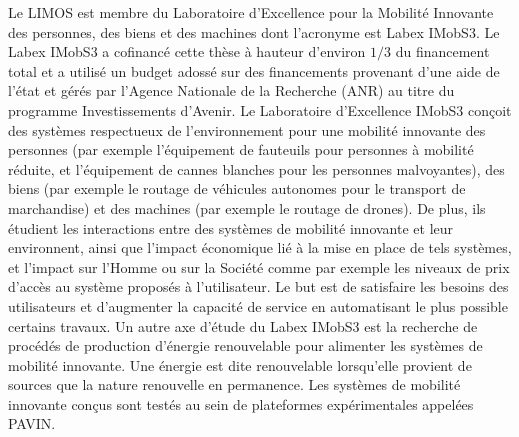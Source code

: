 Le LIMOS est membre du Laboratoire d'Excellence pour la Mobilité Innovante des personnes, des biens et des machines dont l'acronyme est Labex IMobS3.
Le Labex IMobS3 a cofinancé cette thèse à hauteur d'environ $1/3$ du financement total et a utilisé un budget adossé sur des financements provenant d'une aide de l'état et gérés par l'Agence Nationale de la Recherche (ANR) au titre du programme Investissements d'Avenir. Le Laboratoire d'Excellence IMobS3 conçoit des systèmes respectueux de l'environnement pour une mobilité innovante des personnes (par exemple l'équipement de fauteuils pour personnes à mobilité réduite, et l'équipement de cannes blanches pour les personnes malvoyantes), des biens (par exemple le routage de véhicules autonomes pour le transport de marchandise) et des machines (par exemple le routage de drones). De plus, ils étudient les interactions entre des systèmes de mobilité innovante et leur environnent, ainsi que l'impact économique lié à la mise en place de tels systèmes, et l'impact sur l'Homme ou sur la Société comme par exemple les niveaux de prix d'accès au système proposés à l'utilisateur. Le but est de satisfaire les besoins des utilisateurs et d'augmenter la capacité de service en automatisant le plus possible certains travaux. Un autre axe d'étude du Labex IMobS3 est la recherche de procédés de production d'énergie renouvelable pour alimenter les systèmes de mobilité innovante. Une énergie est dite renouvelable lorsqu'elle provient de sources que la nature renouvelle en permanence.
Les systèmes de mobilité innovante conçus sont testés au sein de plateformes expérimentales appelées PAVIN.

